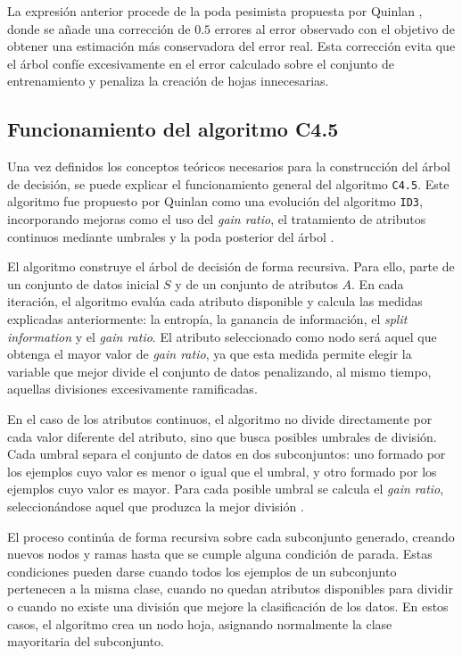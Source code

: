 La expresión anterior procede de la poda pesimista propuesta por Quinlan \cite{quinlan1987simplifying}, donde se añade una corrección de $0.5$ errores al error observado con el objetivo de obtener una estimación más conservadora del error real. Esta corrección evita que el árbol confíe excesivamente en el error calculado sobre el conjunto de entrenamiento y penaliza la creación de hojas innecesarias.

\subsection{\textbf{Funcionamiento del algoritmo C4.5}}

Una vez definidos los conceptos teóricos necesarios para la construcción del árbol de decisión, se puede explicar el funcionamiento general del algoritmo \texttt{C4.5}. Este algoritmo fue propuesto por Quinlan como una evolución del algoritmo \texttt{ID3}, incorporando mejoras como el uso del \textit{gain ratio}, el tratamiento de atributos continuos mediante umbrales y la poda posterior del árbol \cite{1986InductionTrees,1996ContinuousC45,2008Top10Algorithms}.

El algoritmo construye el árbol de decisión de forma recursiva. Para ello, parte de un conjunto de datos inicial $S$ y de un conjunto de atributos $A$. En cada iteración, el algoritmo evalúa cada atributo disponible y calcula las medidas explicadas anteriormente: la entropía, la ganancia de información, el \textit{split information} y el \textit{gain ratio}. El atributo seleccionado como nodo será aquel que obtenga el mayor valor de \textit{gain ratio}, ya que esta medida permite elegir la variable que mejor divide el conjunto de datos penalizando, al mismo tiempo, aquellas divisiones excesivamente ramificadas.

En el caso de los atributos continuos, el algoritmo no divide directamente por cada valor diferente del atributo, sino que busca posibles umbrales de división. Cada umbral separa el conjunto de datos en dos subconjuntos: uno formado por los ejemplos cuyo valor es menor o igual que el umbral, y otro formado por los ejemplos cuyo valor es mayor. Para cada posible umbral se calcula el \textit{gain ratio}, seleccionándose aquel que produzca la mejor división \cite{1996ContinuousC45}.

El proceso continúa de forma recursiva sobre cada subconjunto generado, creando nuevos nodos y ramas hasta que se cumple alguna condición de parada. Estas condiciones pueden darse cuando todos los ejemplos de un subconjunto pertenecen a la misma clase, cuando no quedan atributos disponibles para dividir o cuando no existe una división que mejore la clasificación de los datos. En estos casos, el algoritmo crea un nodo hoja, asignando normalmente la clase mayoritaria del subconjunto.

